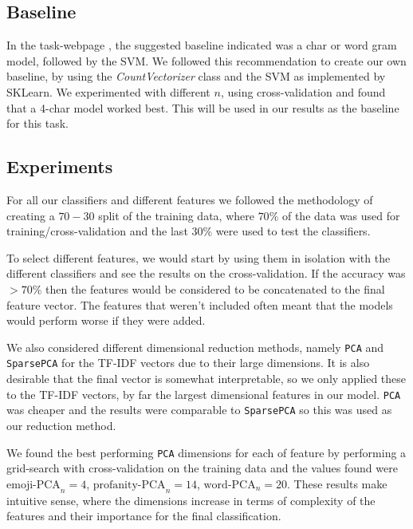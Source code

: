 
\subsection{Baseline}
    In the task-webpage \cite{irony_detect_twitter}, the suggested baseline indicated was a char or word gram model, followed by the SVM. We followed this recommendation to create our own baseline, by using the \emph{CountVectorizer} class and the SVM as implemented by SKLearn. We experimented with different $n$, using cross-validation and found that a 4-char model worked best. This will be used in our results as the baseline for this task.

\subsection{Experiments}
    For all our classifiers and different features we followed the methodology of creating a $70-30$ split of the training data, where $70\%$ of the data was used for training/cross-validation and the last $30\%$ were used to test the classifiers. 
    
    To select different features, we would start by using them in isolation with the different classifiers and see the results on the cross-validation. If the accuracy was $>70\%$ then the features would be considered to be concatenated to the final feature vector.
    The features that weren't included often meant that the models would perform worse if they were added. 
    
    We also considered different dimensional reduction methods, namely \verb'PCA' and \verb'SparsePCA' for the TF-IDF vectors due to their large dimensions. It is also desirable that the final vector is somewhat interpretable, so we only applied these to the TF-IDF vectors, by far the largest dimensional features in our model. \verb'PCA' was cheaper and the results were comparable to \verb'SparsePCA' so this was used as our reduction method.
    
    We found the best performing \verb'PCA' dimensions for each of feature by performing a grid-search with cross-validation on the training data and the values found were $\text{emoji-PCA}_n = 4$, $\text{profanity-PCA}_n = 14$, $\text{word-PCA}_n = 20$. These results make intuitive sense, where the dimensions increase in terms of complexity of the features and their importance for the final classification. 
    
